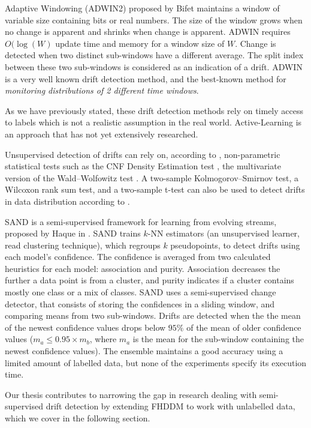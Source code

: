 Adaptive Windowing (ADWIN2) proposed by Bifet\cite{bifet2007learning} maintains a window of variable size containing bits or real numbers. The size of the window grows when no change is apparent and shrinks when change is apparent. ADWIN requires $O(\log(W)$ update time and memory for a window size of $W$. Change is detected when two distinct sub-windows have a different average. The split index between these two sub-windows is considered as an indication of a drift. ADWIN is a very well known drift detection method, and the best-known method for \textit{monitoring distributions of 2 different time windows}.

As we have previously stated, these drift detection methods rely on timely access to labels which is not a realistic assumption in the real world.  Active-Learning is an approach that has not yet extensively researched.

Unsupervised detection of drifts can rely on, according to \cite{sobolewski2013concept}, non-parametric statistical tests such as the CNF Density Estimation test \cite{dries2009adaptive}, the multivariate version of the Wald–Wolfowitz test \cite{friedman1979multivariate}.
A two-sample Kolmogorov–Smirnov test, a Wilcoxon rank sum test, and a two-sample t-test can also be used to detect drifts in data distribution according to \cite{sobolewski2013concept, sheskin2003handbook}.

\label{paragraph:SAND}SAND is a semi-supervised framework for learning from evolving streams, proposed by Haque in \cite{haque2015sand}. SAND trains $k$-NN estimators (an unsupervised learner, read clustering technique), which regroups $k$ pseudopoints, to detect drifts using each model's confidence. The confidence is averaged from two calculated heuristics for each model: association and purity. Association decreases the further a data point is from a cluster, and purity indicates if a cluster contains mostly one class or a mix of classes. SAND uses a semi-supervised change detector, that consists of storing the confidences in a sliding window, and comparing means from two sub-windows. Drifts are detected when the the mean of the newest confidence values drops below $95\%$ of the mean of older confidence values ($m_a \leq 0.95\times m_b$, where $m_a$ is the mean for the sub-window containing the newest confidence values). The ensemble maintains a good accuracy using a limited amount of labelled data, but none of the experiments specify its execution time.

Our thesis contributes to narrowing the gap in research dealing with semi-supervised drift detection by extending FHDDM to work with unlabelled data, which we cover in the following section.

